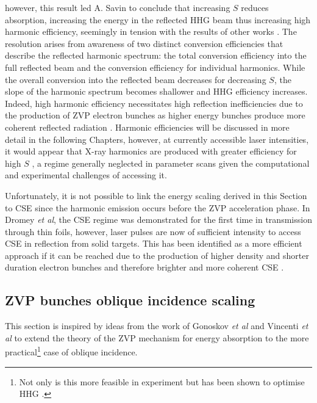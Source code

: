however, this result led A. Savin to conclude that increasing $S$ reduces absorption, increasing the energy in the reflected \ac{HHG} beam thus increasing high harmonic efficiency, seemingly in tension with the results of other works \cite{gonoskovUltrarelativisticNanoplasmonicsRoute2011,edwardsXRayEmissionEffectiveness2020}. The resolution arises from awareness of two distinct conversion efficiencies that describe the reflected harmonic spectrum: the total conversion efficiency into the full reflected beam and the conversion efficiency for individual harmonics. While the overall conversion into the reflected beam decreases for decreasing $S$, the slope of the harmonic spectrum becomes shallower and \ac{HHG} efficiency increases. Indeed, high harmonic efficiency necessitates high reflection inefficiencies due to the production of ZVP electron bunches as higher energy bunches produce more coherent reflected radiation \cite{edwardsXRayEmissionEffectiveness2020}. Harmonic efficiencies will be discussed in more detail in the following Chapters, however, at currently accessible laser intensities, it would appear that X-ray harmonics are produced with greater efficiency for high $S$ \cite{pukhovRelativisticHighHarmonics2009}, a regime generally neglected in parameter scans given the computational and experimental challenges of accessing it.

Unfortunately, it is not possible to link the energy scaling derived in this Section to \ac{CSE} since the harmonic emission occurs before the \ac{ZVP} acceleration phase. In Dromey \textit{et al}, the \ac{CSE} regime was demonstrated for the first time in transmission through thin foils, however, laser pulses are now of sufficient intensity to access \ac{CSE} in reflection from solid targets. This has been identified as a more efficient approach if it can be reached due to the production of higher density and shorter duration electron bunches and therefore brighter and more coherent \ac{CSE} \cite{edwardsElectronNanobunchWidthDominatedSpectralPower2020}. 

\subsection{ZVP bunches oblique incidence scaling}
This section is inspired by ideas from the work of Gonoskov \textit{et al} \cite{gonoskovUltrarelativisticNanoplasmonicsRoute2011} and Vincenti \textit{et al} \cite{vincentiOpticalPropertiesRelativistic2014} to extend the theory of the ZVP mechanism for energy absorption to the more practical\footnote{Not only is this more feasible in experiment but has been shown to optimise HHG \cite{gonoskovUltrarelativisticNanoplasmonicsRoute2011}.} case of oblique incidence. 

